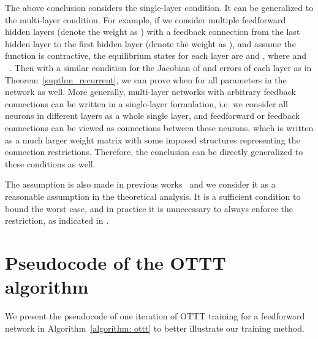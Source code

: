 \documentclass{article}
\begin{document}
\begin{remark}
The above conclusion considers the single-layer condition. It can be generalized to the multi-layer condition. For example, if we consider multiple feedforward hidden layers (denote the weight as ) with a feedback connection from the last hidden layer to the first hidden layer (denote the weight as ), and assume the function is contractive, the equilibrium states for each layer are  and , where  and ~\cite{xiao2021training}. Then with a similar condition for the Jacobian of  and errors  of each layer as in Theorem~\ref{supthm_recurrent}, we can prove  when  for all parameters  in the network as well.
More generally, multi-layer networks with arbitrary feedback connections can be written in a single-layer formulation, i.e. we consider all neurons in different layers as a whole single layer, and feedforward or feedback connections can be viewed as connections between these neurons, which is written as a much larger weight matrix with some imposed structures representing the connection restrictions. Therefore, the conclusion can be directly generalized to these conditions as well.
\end{remark}

\begin{remark}
The assumption  is also made in previous works~\cite{fung2021jfb,geng2021training} and we consider it as a reasonable assumption in the theoretical analysis. It is a sufficient condition to bound the worst case, and in practice it is unnecessary to always enforce the restriction, as indicated in \cite{fung2021jfb}.
\end{remark}

\section{Pseudocode of the OTTT algorithm}

We present the pseudocode of one iteration of OTTT training for a feedforward network in Algorithm~\ref{algorithm: ottt} to better illustrate our training method.
\end{document}
